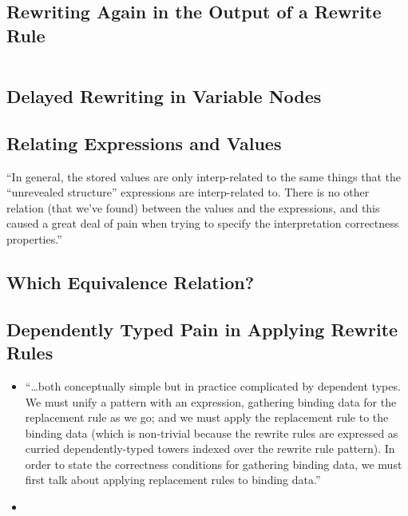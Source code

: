 \subsection{Rewriting Again in the Output of a Rewrite Rule}
$\left.\right.$

\subsection{Delayed Rewriting in Variable Nodes}\label{sec:rewriting-more:delayed-rewriting}

\subsection{Relating Expressions and Values}
``In general, the stored values are only interp-related to the same things that the ``unrevealed structure'' expressions are interp-related to. There is no other relation (that we've found) between the values and the expressions, and this caused a great deal of pain when trying to specify the interpretation correctness properties.''

\subsection{Which Equivalence Relation?}\label{sec:rewriting-more:which-equivalence}

\subsection{Dependently Typed Pain in Applying Rewrite Rules}
\begin{itemize}
\item {}
``\ldots\space both conceptually simple but in practice complicated by dependent types.
We must unify a pattern with an expression, gathering binding data for the replacement rule as we go; and we must apply the replacement rule to the binding data (which is non-trivial because the rewrite rules are expressed as curried dependently-typed towers indexed over the rewrite rule pattern).
In order to state the correctness conditions for gathering binding data, we must first talk about applying replacement rules to binding data.''
\item {}
\end{itemize}

